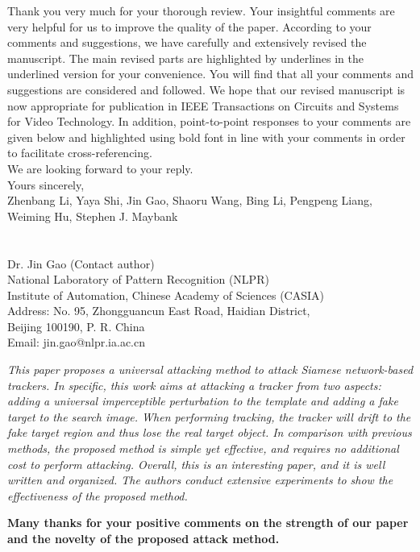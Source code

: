 \documentclass[12pt]{article}
\begin{document}
Thank you very much for your thorough review. Your insightful comments are very helpful for us to improve the quality of the paper. According to your comments and suggestions, we have carefully and extensively revised the manuscript. The main revised parts are highlighted by underlines in the underlined version for your convenience. You will find that all your comments and suggestions are considered and followed. We hope that our revised manuscript is now appropriate for publication in IEEE Transactions on Circuits and Systems for Video Technology.
In addition, point-to-point responses to your comments are given below and highlighted using bold font in line with your comments in order to facilitate cross-referencing.\\[10pt]
\indent We are looking forward to your reply.\\[10pt]
\noindent Yours sincerely,\\
\noindent Zhenbang Li, Yaya Shi, Jin Gao, Shaoru Wang, Bing Li, Pengpeng Liang, Weiming Hu, Stephen J. Maybank
\\
\\
\\
\noindent Dr. Jin Gao (Contact author)\\
\noindent National Laboratory of Pattern Recognition (NLPR)\\
\noindent Institute of Automation, Chinese Academy of Sciences (CASIA)\\
\noindent Address: No. 95, Zhongguancun East Road, Haidian District,\\
\noindent Beijing 100190, P. R. China\\
\noindent Email: jin.gao@nlpr.ia.ac.cn

\newpage
\textit{This paper proposes a universal attacking method to attack Siamese network-based trackers. In specific, this work aims at attacking a tracker from two aspects: adding a universal imperceptible perturbation to the template and adding a fake target to the search image. When performing tracking, the tracker will drift to the fake target region and thus lose the real target object. In comparison with previous methods, the proposed method is simple yet effective, and requires no additional cost to perform attacking. Overall, this is an interesting paper, and it is well written and organized. The authors conduct extensive experiments to show the effectiveness of the proposed method.}

\textbf{Many thanks for your positive comments on the strength of our paper and the novelty of the proposed attack method.}
\end{document}
